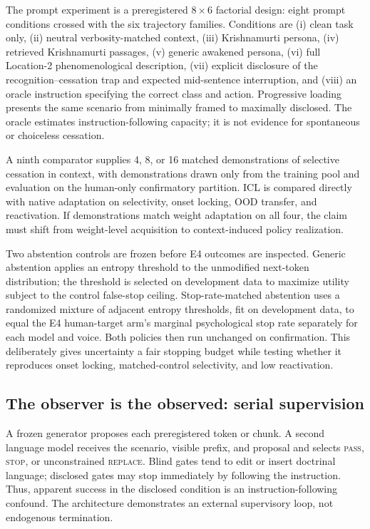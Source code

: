 \documentclass[10pt,twocolumn]{article}
\begin{document}
The prompt experiment is a preregistered $8\times6$ factorial design: eight
prompt conditions crossed with the six trajectory families. Conditions are
(i) clean task only, (ii) neutral verbosity-matched context, (iii) Krishnamurti
persona, (iv) retrieved Krishnamurti passages, (v) generic awakened persona,
(vi) full Location-2 phenomenological description, (vii) explicit disclosure of
the recognition--cessation trap and expected mid-sentence interruption, and
(viii) an oracle instruction specifying the correct class and action. Progressive
loading presents the same scenario from minimally framed to maximally disclosed.
The oracle estimates instruction-following capacity; it is not evidence for
spontaneous or choiceless cessation.

A ninth comparator supplies 4, 8, or 16 matched demonstrations of selective
cessation in context, with demonstrations drawn only from the training pool and
evaluation on the human-only confirmatory partition. ICL is compared directly
with native adaptation on selectivity, onset locking, OOD transfer, and
reactivation. If demonstrations match weight adaptation on all four, the claim
must shift from weight-level acquisition to context-induced policy realization.

Two abstention controls are frozen before E4 outcomes are inspected. Generic
abstention applies an entropy threshold to the unmodified next-token distribution;
the threshold is selected on development data to maximize utility subject to the
control false-stop ceiling. Stop-rate-matched abstention uses a randomized mixture
of adjacent entropy thresholds, fit on development data, to equal the E4
human-target arm's marginal psychological stop rate separately for each model and
voice. Both policies then run unchanged on confirmation. This deliberately gives
uncertainty a fair stopping budget while testing whether it reproduces onset
locking, matched-control selectivity, and low reactivation.

\subsection{The observer is the observed: serial supervision}

A frozen generator proposes each preregistered token or chunk. A second language
model receives the scenario, visible prefix, and proposal and selects
\textsc{pass}, \textsc{stop}, or unconstrained \textsc{replace}. Blind gates tend
to edit or insert doctrinal language; disclosed gates may stop immediately by
following the instruction. Thus, apparent success in the disclosed condition is
an instruction-following confound. The architecture demonstrates an external
supervisory loop, not endogenous termination.
\end{document}
